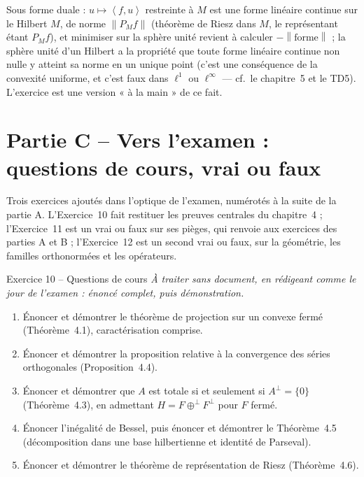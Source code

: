 \documentclass[11pt,a4paper]{article}
\newcommand{\norm}[1]{\left\|#1\right\|}
\newcommand{\ps}[2]{\left\langle #1,#2\right\rangle}
\theoremstyle{definition}
\begin{document}
\begin{commentaire}
Sous forme duale : $u\mapsto\ps fu$ restreinte à $M$ est une forme linéaire continue sur le Hilbert $M$, de norme $\norm{P_Mf}$ (théorème de Riesz dans $M$, le représentant étant $P_Mf$), et minimiser sur la sphère unité revient à calculer $-\norm{\text{forme}}$ ; la sphère unité d'un Hilbert a la propriété que toute forme linéaire continue non nulle y atteint sa norme en un unique point (c'est une conséquence de la convexité uniforme, et c'est faux dans $\ell^1$ ou $\ell^\infty$ — cf.\ le chapitre~5 et le TD5). L'exercice est une version « à la main » de ce fait.
\end{commentaire}

\section*{Partie C -- Vers l'examen : questions de cours, vrai ou faux}

\begin{commentaire}
Trois exercices ajoutés dans l'optique de l'examen, numérotés à la suite de la partie A. L'Exercice~10 fait restituer les preuves centrales du chapitre~4 ; l'Exercice~11 est un vrai ou faux sur ses pièges, qui renvoie aux exercices des parties A et B ; l'Exercice~12 est un second vrai ou faux, sur la géométrie, les familles orthonormées et les opérateurs.
\end{commentaire}

\begin{exo}{Exercice 10 -- Questions de cours}
\emph{À traiter sans document, en rédigeant comme le jour de l'examen : énoncé complet, puis démonstration.}
\begin{enumerate}[label=(\alph*)]
  \item Énoncer et démontrer le théorème de projection sur un convexe fermé (Théorème~4.1), caractérisation comprise.
  \item Énoncer et démontrer la proposition relative à la convergence des séries orthogonales (Proposition~4.4).
  \item Énoncer et démontrer que $A$ est totale si et seulement si $A^\perp=\{0\}$ (Théorème~4.3), en admettant $H=F\oplus^\perp F^\perp$ pour $F$ fermé.
  \item Énoncer l'inégalité de Bessel, puis énoncer et démontrer le Théorème~4.5 (décomposition dans une base hilbertienne et identité de Parseval).
  \item Énoncer et démontrer le théorème de représentation de Riesz (Théorème~4.6).
\end{enumerate}
\end{exo}
\end{document}
